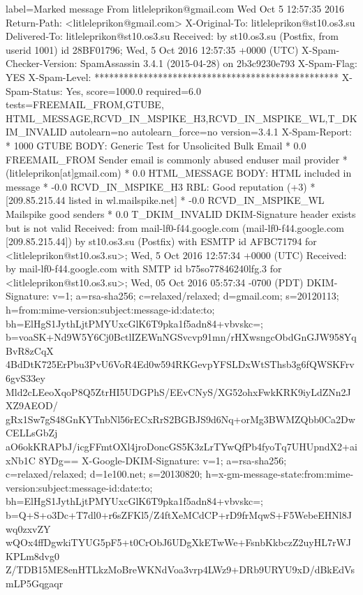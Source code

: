 \documentclass[a4paper,11pt]{article}
\begin{document}
\begin{bashcode*}{label=Marked message}
From litleleprikon@gmail.com  Wed Oct  5 12:57:35 2016
Return-Path: <litleleprikon@gmail.com>
X-Original-To: litleleprikon@st10.os3.su
Delivered-To: litleleprikon@st10.os3.su
Received: by st10.os3.su (Postfix, from userid 1001)
        id 28BF01796; Wed,  5 Oct 2016 12:57:35 +0000 (UTC)
X-Spam-Checker-Version: SpamAssassin 3.4.1 (2015-04-28) on 2b3c9230e793
X-Spam-Flag: YES
X-Spam-Level: **************************************************
X-Spam-Status: Yes, score=1000.0 required=6.0 tests=FREEMAIL_FROM,GTUBE,
        HTML_MESSAGE,RCVD_IN_MSPIKE_H3,RCVD_IN_MSPIKE_WL,T_DKIM_INVALID autolearn=no
        autolearn_force=no version=3.4.1
X-Spam-Report:
        * 1000 GTUBE BODY: Generic Test for Unsolicited Bulk Email
        *  0.0 FREEMAIL_FROM Sender email is commonly abused enduser mail provider
        *      (litleleprikon[at]gmail.com)
        *  0.0 HTML_MESSAGE BODY: HTML included in message
        * -0.0 RCVD_IN_MSPIKE_H3 RBL: Good reputation (+3)
        *      [209.85.215.44 listed in wl.mailspike.net]
        * -0.0 RCVD_IN_MSPIKE_WL Mailspike good senders
        *  0.0 T_DKIM_INVALID DKIM-Signature header exists but is not valid
Received: from mail-lf0-f44.google.com (mail-lf0-f44.google.com [209.85.215.44])
        by st10.os3.su (Postfix) with ESMTP id AFBC71794
        for <litleleprikon@st10.os3.su>; Wed,  5 Oct 2016 12:57:34 +0000 (UTC)
Received: by mail-lf0-f44.google.com with SMTP id b75so77846240lfg.3
        for <litleleprikon@st10.os3.su>; Wed, 05 Oct 2016 05:57:34 -0700 (PDT)
DKIM-Signature: v=1; a=rsa-sha256; c=relaxed/relaxed;
        d=gmail.com; s=20120113;
        h=from:mime-version:subject:message-id:date:to;
        bh=ElHgS1JythLjtPMYUxcGlK6T9pka1f5adn84+vbvskc=;
        b=voaSK+Nd9W5Y6Cj0BctlIZEWnNGSvcvp91mn/rHXwsngcObdGnGJW958YqBvR8zCqX
         4BdDtK725ErPbu3PvU6VoR4Ed0w594RKGevpYFSLDxWtSThsb3g6fQWSKFrv6gvS33ey
         Mld2cLEeoXqoP8Q5ZtrHI5UDGPhS/EEvCNyS/XG52ohxFwkKRK9iyLdZNn2JXZ9AEOD/
         gRx1Sw7gS48GnKYTnbNl56rECxRrS2BGBJS9d6Nq+orMg3BWMZQbb0Ca2DwCELLsGbZj
         aO6okKRAPbJ/icgFFmtOXl4jroDoncGS5K3zLrTYwQfPb4fyoTq7UHUpndX2+aixNb1C
         8YDg==
X-Google-DKIM-Signature: v=1; a=rsa-sha256; c=relaxed/relaxed;
        d=1e100.net; s=20130820;
        h=x-gm-message-state:from:mime-version:subject:message-id:date:to;
        bh=ElHgS1JythLjtPMYUxcGlK6T9pka1f5adn84+vbvskc=;
        b=Q+S+o3Dc+T7dl0+r6sZFKl5/Z4ftXeMCdCP+rD9frMqwS+F5WebeEHNl8Jwq0zxvZY
         wQOx4ffDgwkiTYUG5pF5+t0CrObJ6UDgXkETwWe+FsnbKkbczZ2uyHL7rWJKPLm8dvg0
         Z/TDB15ME8enHTLkzMoBreWKNdVoa3vrp4LWz9+DRb9URYU9xD/dBkEdVsmLP5Gqgaqr

\end{bashcode*}
\end{document}
